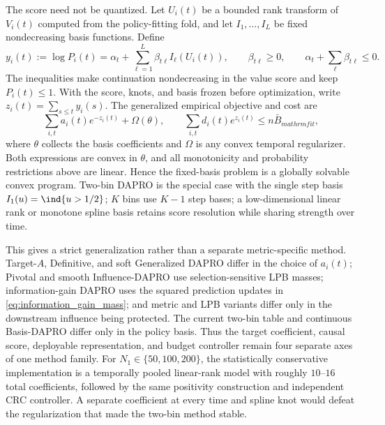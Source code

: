 The score need not be quantized.  Let $U_i(t)$ be a bounded rank transform of
$V_i(t)$ computed from the policy-fitting fold, and let
$I_1,\ldots,I_L$ be fixed nondecreasing basis functions.  Define
\begin{equation}
    y_i(t):=\log P_i(t)
    =\alpha_t+\sum_{\ell=1}^L\beta_{t\ell}I_\ell(U_i(t)),
    \qquad
    \beta_{t\ell}\geq0,
    \qquad
    \alpha_t+\sum_\ell\beta_{t\ell}\leq0.
    \label{eq:basis_dapro_policy}
\end{equation}
The inequalities make continuation nondecreasing in the value score and keep
$P_i(t)\leq1$.  With the score, knots, and basis frozen before optimization,
write $z_i(t)=\sum_{s\leq t}y_i(s)$.  The generalized empirical objective and
cost are
\begin{equation}
    \sum_{i,t}a_i(t)e^{-z_i(t)}+\Omega(\theta),
    \qquad
    \sum_{i,t}d_i(t)e^{z_i(t)}\leq n\bar B_{mathrm{fit}},
    \label{eq:basis_dapro_convex_program}
\end{equation}
where $\theta$ collects the basis coefficients and $\Omega$ is any convex
temporal regularizer.  Both expressions are convex in $\theta$, and all
monotonicity and probability restrictions above are linear.  Hence the
fixed-basis problem is a globally solvable convex program.  Two-bin DAPRO is
the special case with the single step basis
$I_1(u)=\ind{u>1/2}$; $K$ bins use $K-1$ step bases; a low-dimensional linear
rank or monotone spline basis retains score resolution while sharing strength
over time.

This gives a strict generalization rather than a separate metric-specific
method.  Target-$A$, Definitive, and soft Generalized DAPRO differ in the
choice of $a_i(t)$; Pivotal and smooth Influence-DAPRO use selection-sensitive
LPB masses; information-gain DAPRO uses the squared prediction updates in
\eqref{eq:information_gain_mass}; and metric and LPB variants differ only in
the downstream influence being protected.  The current two-bin table and
continuous Basis-DAPRO differ only in the policy basis.  Thus the target
coefficient, causal score, deployable representation, and budget controller
remain four separate axes of one method family.
For $N_1\in\{50,100,200\}$, the statistically conservative implementation is
a temporally pooled linear-rank model with roughly $10$--$16$ total
coefficients, followed by the same positivity construction and independent
CRC controller.  A separate coefficient at every time and spline knot would
defeat the regularization that made the two-bin method stable.

